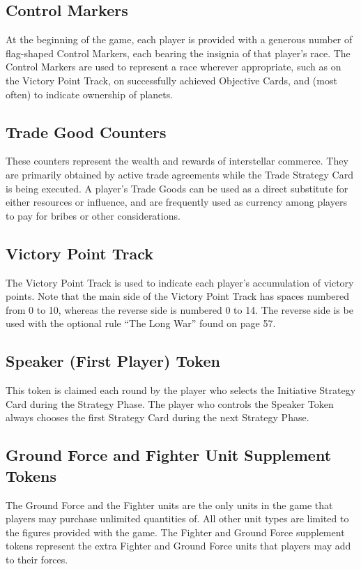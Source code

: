 \documentclass[11pt,fleqn]{book} %
\begin{document}
\subsection{Control Markers}
At the beginning of the game, each player is provided with a generous number of flag-shaped Control Markers, each bearing the insignia of that player's race. The Control Markers are used to represent a race wherever appropriate, such as on the Victory Point Track, on successfully achieved Objective Cards, and (most often) to indicate ownership of planets.

\subsection{Trade Good Counters}
These counters represent the wealth and rewards of interstellar commerce. They are primarily obtained by active trade agreements while the Trade Strategy Card is being executed. A player's Trade Goods can be used as a direct substitute for either resources or influence, and are frequently used as currency among players to pay for bribes or other considerations.

\subsection{Victory Point Track}
The Victory Point Track is used to indicate each player's accumulation of victory points. Note that the main side of the Victory Point Track has spaces numbered from 0 to 10, whereas the reverse side is numbered 0 to 14. The reverse side is be used with the optional rule “The Long War” found on page 57.

\subsection{Speaker (First Player) Token}
This token is claimed each round by the player who selects the Initiative Strategy Card during the Strategy Phase. The player who controls the Speaker Token always chooses the first Strategy Card during the next Strategy Phase.

\subsection{Ground Force and Fighter Unit Supplement Tokens}
The Ground Force and the Fighter units are the only units in the game that players may purchase unlimited quantities of. All other unit types are limited to the figures provided with the game. The Fighter and Ground Force supplement tokens represent the extra Fighter and Ground Force units that players may add to their forces.
\end{document}
